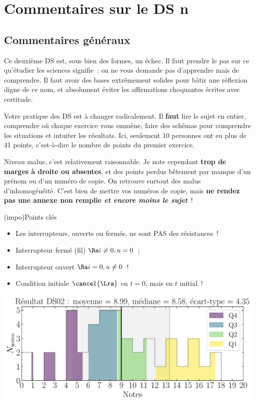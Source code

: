 \documentclass[a4paper, 10pt, final, garamond]{book}
\begin{document}
\setcounter{chapter}{1}

\chapter{Commentaires sur le DS n}

\section{Commentaires généraux}

Ce deuxième DS est, sous bien des formes, un échec. Il faut prendre le pas sur
ce qu'étudier les sciences signifie~: on ne vous demande pas d'apprendre mais de
comprendre. Il faut avoir des bases extrêmement solides pour bâtir une réflexion
digne de ce nom, et absolument éviter les affirmations choquantes écrites avec
certitude.

Votre pratique des DS est à changer radicalement. Il \textbf{faut} lire le sujet
en entier, comprendre où chaque exercice vous emmène, faire des schémas pour
comprendre les situations et intuiter les résultats. Ici, seulement 10 personnes
ont eu plus de 41 points, c'est-à-dire le nombre de points du premier exercice.

Niveau malus, c'est relativement raisonnable. Je note cependant \textbf{trop de
	marges à droite ou absentes}, et des points perdus bêtement par manque d'un
prénom ou d'un numéro de copie. On retrouve surtout des malus d'inhomogénéité.
C'est bien de mettre vos numéros de copie, mais \textbf{ne rendez pas une annexe
	non remplie \textit{et encore moins le sujet}}~!

\begin{tcb}[bld,cnt,fontupper=\Large](impo){Points clés}
	\begin{itemize}
		\item Les interrupteurs, ouverts ou fermés, ne sont PAS des résistances~!
		\item Interrupteur fermé (fil) $\Ra i \neq 0, u = 0$~;
		\item Interrupteur ouvert $\Ra i=0, u \neq 0$~!
		\item Condition initiale $\cancel{\Lra}$ en $t=0$, mais en $t$ initial~!
	\end{itemize}
\end{tcb}

\begin{center}
	\includegraphics[width=.7\linewidth]{DS02_rslt.pdf}
\end{center}
\end{document}
